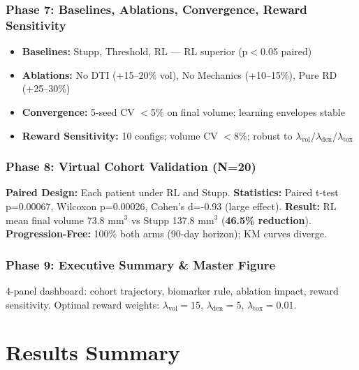 \documentclass[11pt, twocolumn]{article}
\begin{document}
\subsubsection{Phase 7: Baselines, Ablations, Convergence, Reward Sensitivity}
\begin{itemize}
\item \textbf{Baselines:} Stupp, Threshold, RL — RL superior (p$<$0.05 paired)
\item \textbf{Ablations:} No DTI (+15--20\% vol), No Mechanics (+10--15\%), Pure RD (+25--30\%)
\item \textbf{Convergence:} 5-seed CV $<$5\% on final volume; learning envelopes stable
\item \textbf{Reward Sensitivity:} 10 configs; volume CV $<$8\%; robust to $\lambda_{\text{vol}}/\lambda_{\text{den}}/\lambda_{\text{tox}}$
\end{itemize}

\subsubsection{Phase 8: Virtual Cohort Validation (N=20)}
\textbf{Paired Design:} Each patient under RL and Stupp.
\textbf{Statistics:} Paired t-test p=0.00067, Wilcoxon p=0.00026, Cohen's d=-0.93 (large effect).
\textbf{Result:} RL mean final volume 73.8 mm$^3$ vs Stupp 137.8 mm$^3$ (\textbf{46.5\% reduction}).
\textbf{Progression-Free:} 100\% both arms (90-day horizon); KM curves diverge.

\subsubsection{Phase 9: Executive Summary \& Master Figure}
4-panel dashboard: cohort trajectory, biomarker rule, ablation impact, reward sensitivity.
Optimal reward weights: $\lambda_{\text{vol}}=15$, $\lambda_{\text{den}}=5$, $\lambda_{\text{tox}}=0.01$.

\section{Results Summary}
\end{document}
